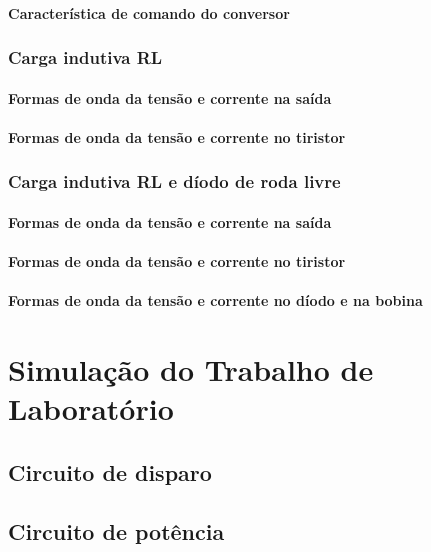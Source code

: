 \documentclass[a4paper,11pt]{article}
\numberwithin{equation}{section}
\begin{document}
\paragraph{Característica de comando do conversor}


\subsubsection{Carga indutiva RL}

\paragraph{Formas de onda da tensão e corrente na saída}


\paragraph{Formas de onda da tensão e corrente no tiristor}



\subsubsection{Carga indutiva RL e díodo de roda livre}

\paragraph{Formas de onda da tensão e corrente na saída}


\paragraph{Formas de onda da tensão e corrente no tiristor}


\paragraph{Formas de onda da tensão e corrente no díodo e na bobina}


\section{Simulação do Trabalho de Laboratório}


\subsection{Circuito de disparo}

\subsection{Circuito de potência}
\end{document}
